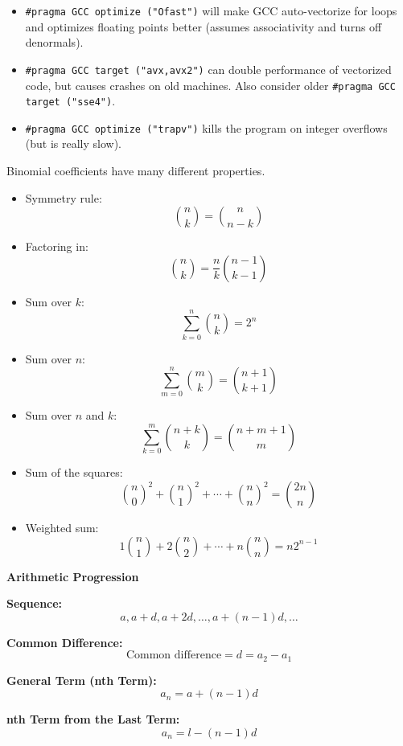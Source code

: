 \fontsize{5.5}{6}\ttfamily
\begin{itemize}[label=•]
    \item \texttt{\#pragma GCC optimize ("Ofast")} will make GCC auto-vectorize for loops and optimizes floating points better (assumes associativity and turns off denormals).
    \item \texttt{\#pragma GCC target ("avx,avx2")} can double performance of vectorized code, but causes crashes on old machines. Also consider older \texttt{\#pragma GCC target ("sse4")}.
    \item \texttt{\#pragma GCC optimize ("trapv")} kills the program on integer overflows (but is really slow).
\end{itemize}


Binomial coefficients have many different properties.
\begin{itemize}
    \item Symmetry rule:
    \[
    \binom{n}{k} = \binom{n}{n-k}
    \]

    \item Factoring in:
    \[
    \binom{n}{k} = \frac{n}{k} \binom{n-1}{k-1}
    \]

    \item Sum over $k$:
    \[
    \sum_{k=0}^{n} \binom{n}{k} = 2^n
    \]

    \item Sum over $n$:
    \[
    \sum_{m=0}^{n} \binom{m}{k} = \binom{n+1}{k+1}
    \]

    \item Sum over $n$ and $k$:
    \[
    \sum_{k=0}^{m} \binom{n+k}{k} = \binom{n+m+1}{m}
    \]

    \item Sum of the squares:
    \[
    \binom{n}{0}^2 + \binom{n}{1}^2 + \cdots + \binom{n}{n}^2 = \binom{2n}{n}
    \]

    \item Weighted sum:
    \[
    1 \binom{n}{1} + 2 \binom{n}{2} + \cdots + n \binom{n}{n} = n 2^{n-1}
    \]
\end{itemize}


\textbf{Arithmetic Progression}

\textbf{Sequence:}
\[ a, a+d, a+2d, \ldots, a+(n-1)d, \ldots \]

\textbf{Common Difference:}
\[ \text{Common difference} = d = a_2 - a_1 \]

\textbf{General Term (nth Term):}
\[ a_n = a + (n-1)d \]

\textbf{nth Term from the Last Term:}
\[ a_n = l - (n-1)d \]


